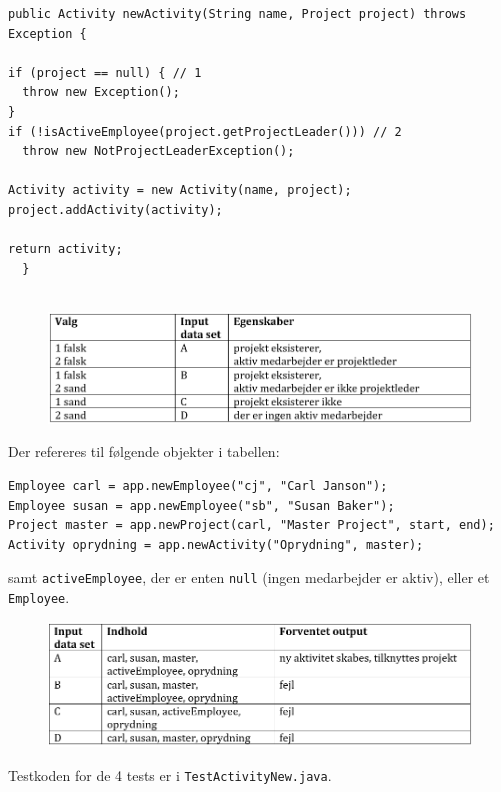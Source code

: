 \begin{lstlisting}
public Activity newActivity(String name, Project project) throws Exception {

if (project == null) { // 1
  throw new Exception();
}
if (!isActiveEmployee(project.getProjectLeader())) // 2
  throw new NotProjectLeaderException();

Activity activity = new Activity(name, project);
project.addActivity(activity);

return activity;
  }
  
\end{lstlisting}


\begin{figure}[H]
    \centering
    \includegraphics[width = \textwidth]{Figurer/whitebox2a.PNG}
    \label{fig:whitebox2a}
\end{figure}

Der refereres til følgende objekter i tabellen:
\begin{lstlisting}
Employee carl = app.newEmployee("cj", "Carl Janson");
Employee susan = app.newEmployee("sb", "Susan Baker");
Project master = app.newProject(carl, "Master Project", start, end);
Activity oprydning = app.newActivity("Oprydning", master);
\end{lstlisting}

samt \texttt{activeEmployee}, der er enten \texttt{null} (ingen medarbejder er aktiv), eller et \texttt{Employee}.

\begin{figure}[H]
    \centering
    \includegraphics[width = \textwidth]{Figurer/whitebox2b.PNG}
    \label{fig:whitebox2b}
\end{figure}

Testkoden for de 4 tests er i \texttt{TestActivityNew.java}.

